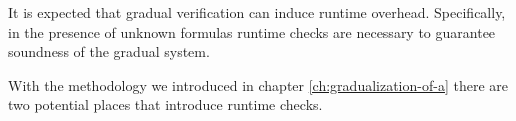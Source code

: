 It is expected that gradual verification can induce runtime overhead.
Specifically, in the presence of unknown formulas runtime checks are necessary to guarantee soundness of the gradual system.

With the methodology we introduced in chapter \ref{ch:gradualization-of-a} there are two potential places that introduce runtime checks.


\label{lemma:runtime-checks-reduced}